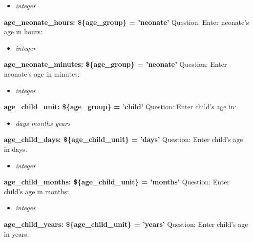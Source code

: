 \documentclass{article}%
\begin{document}
%
\begin{itemize}%
\item%
\textit{integer\newline%
}%
\end{itemize}%
\textbf{age\_neonate\_hours: \$\{age\_group\} = 'neonate'\newline%
}%
Question: Enter neonate's age in hours:\newline%
%
\begin{itemize}%
\item%
\textit{integer\newline%
}%
\end{itemize}%
\textbf{age\_neonate\_minutes: \$\{age\_group\} = 'neonate'\newline%
}%
Question: Enter neonate's age in minutes:\newline%
%
\begin{itemize}%
\item%
\textit{integer\newline%
}%
\end{itemize}%
\textbf{age\_child\_unit: \$\{age\_group\} = 'child'\newline%
}%
Question: Enter child's age in:\newline%
%
\begin{itemize}%
\item%
\textit{days\newline%
 months\newline%
 years\newline%
}%
\end{itemize}%
\textbf{age\_child\_days: \$\{age\_child\_unit\} = 'days'\newline%
}%
Question: Enter child's age in days:\newline%
%
\begin{itemize}%
\item%
\textit{integer\newline%
}%
\end{itemize}%
\textbf{age\_child\_months: \$\{age\_child\_unit\} = 'months'\newline%
}%
Question: Enter child's age in months:\newline%
%
\begin{itemize}%
\item%
\textit{integer\newline%
}%
\end{itemize}%
\textbf{age\_child\_years: \$\{age\_child\_unit\} = 'years'\newline%
}%
Question: Enter child's age in years:\newline%
\end{document}
